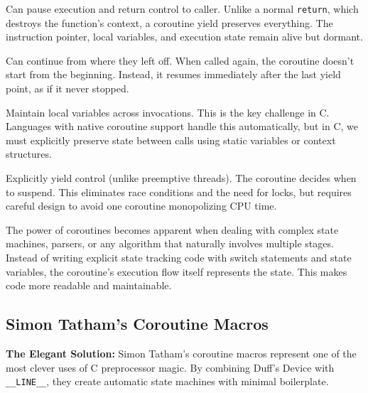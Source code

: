 \begin{description}[style=nextline,leftmargin=0pt]
    \item[\textbf{Suspendable}] Can pause execution and return control to caller. Unlike a normal \texttt{return}, which destroys the function's context, a coroutine yield preserves everything. The instruction pointer, local variables, and execution state remain alive but dormant.

    \item[\textbf{Resumable}] Can continue from where they left off. When called again, the coroutine doesn't start from the beginning. Instead, it resumes immediately after the last yield point, as if it never stopped.

    \item[\textbf{State Preservation}] Maintain local variables across invocations. This is the key challenge in C. Languages with native coroutine support handle this automatically, but in C, we must explicitly preserve state between calls using static variables or context structures.

    \item[\textbf{Cooperative}] Explicitly yield control (unlike preemptive threads). The coroutine decides when to suspend. This eliminates race conditions and the need for locks, but requires careful design to avoid one coroutine monopolizing CPU time.
\end{description}

The power of coroutines becomes apparent when dealing with complex state machines, parsers, or any algorithm that naturally involves multiple stages. Instead of writing explicit state tracking code with switch statements and state variables, the coroutine's execution flow itself represents the state. This makes code more readable and maintainable.

\subsection{Simon Tatham's Coroutine Macros}

\begin{tipbox}
\textbf{The Elegant Solution:} Simon Tatham's coroutine macros represent one of the most clever uses of C preprocessor magic. By combining Duff's Device with \texttt{\_\_LINE\_\_}, they create automatic state machines with minimal boilerplate.
\end{tipbox}

\vspace{0.3cm}

